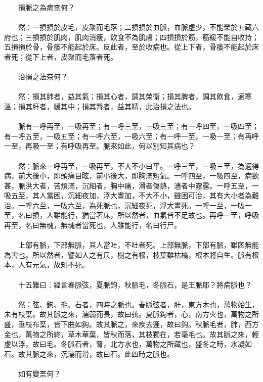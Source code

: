 　　損脈之為病柰何？
\\\\
　　然：一損損於皮毛，皮聚而毛落；二損損於血脈，血脈虛少，不能榮於五藏六府也；三損損於肌肉，肌肉消瘦，飲食不為肌膚；四損損於筋，筋緩不能自收持；五損損於骨，骨痿不能起於床。反此者，至於收病也。從上下者，骨痿不能起於床者死；從下上者，皮聚而毛落者死。
\\\\
　　治損之法奈何？
\\\\
　　然：損其肺者，益其氣；損其心者，調其榮衛；損其脾者，調其飲食，適寒溫；損其肝者，緩其中；損其腎者，益其精，此治損之法也。
\\\\
　　脈有一呼再至，一吸再至；有一呼三至，一吸三至；有一呼四至，一吸四至；有一呼五至，一吸五至；有一呼六至，一吸六至；有一呼一至，一吸一至；有再呼一至，再吸一至；有呼吸再至。脈來如此，何以別知其病也？
\\\\
　　然：脈來一呼再至，一吸再至，不大不小曰平。一呼三至，一吸三至，為適得病，前大後小，即頭痛目眩，前小後大，即胸滿短氣。一呼四至，一吸四至，病欲甚，脈洪大者，苦煩滿，沉細者，胸中痛，滑者傷熱，濇者中霧露。一呼五至，一吸五至，其人當困，沉細夜加，浮大晝加，不大不小，雖困可治，其有大小者為難治。一呼六至，一吸六至，為死脈也，沉細夜死，浮大晝死。一呼一至，一吸一至，名曰損，人雖能行，猶當著床，所以然者，血氣皆不足故也。再呼一至，呼吸再至，名曰無魂，無魂者當死也，人雖能行，名曰行尸。
\\\\
　　上部有脈，下部無脈，其人當吐，不吐者死。上部無脈，下部有脈，雖困無能為害也。所以然者，譬如人之有尺，樹之有根，枝葉雖枯槁，根本將自生。脈有根本，人有元氣，故知不死。
\\\\
　　十五難曰：經言春脈弦，夏脈鉤，秋脈毛，冬脈石，是王脈耶？將病脈也？
\\\\
　　然：弦、鉤、毛、石者，四時之脈也。春脈弦者，肝，東方木也，萬物始生，未有枝葉。故其脈之來，濡弱而長，故曰弦。夏脈鉤者，心，南方火也，萬物之所盛，垂枝布葉，皆下曲如鉤。故其脈之，來疾去遲，故曰鉤。秋脈毛者，肺，西方金也，萬物之所終，草木華葉，皆秋而落，其枝獨在，若毫毛也。故其脈之來，輕虛以浮，故曰毛。冬脈石者，腎，北方水也，萬物之所藏也，盛冬之時，水凝如石。故其脈之來，沉濡而滑，故曰石。此四時之脈也。
\\\\
　　如有變柰何？
\\\\
